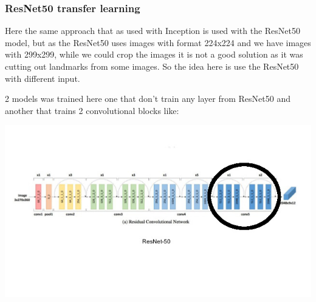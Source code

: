 \documentclass[11pt]{article}
\begin{document}
\subsubsection{ResNet50 transfer learning}
\label{sec:org80f8f36}
Here the same approach that as used with Inception is used with the ResNet50 \cite{he2016deep}  
model, but as the ResNet50 uses images with format 224x224 and we have images
with 299x299, while we could crop the images it is not a good solution as it
was cutting out landmarks from some images. So the idea here is use the
ResNet50 with different input. 

2 models was trained here one that don't train any layer from ResNet50 and
another that trains 2 convolutional blocks like:

\begin{center}
\includegraphics[width=.9\linewidth]{./images/resnet50.jpg}
\end{center}


\pagebreak
\end{document}
